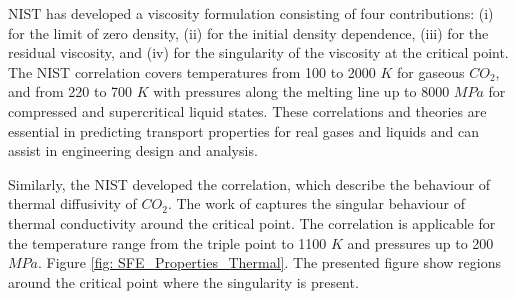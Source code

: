 \documentclass[../Article_Model_Parameters.tex]{subfiles}
\begin{document}
	NIST has developed a viscosity formulation consisting of four contributions: (i) for the limit of zero density, (ii) for the initial density dependence, (iii) for the residual viscosity, and (iv) for the singularity of the viscosity at the critical point. The NIST correlation covers temperatures from 100 to 2000 $K$ for gaseous $CO_2$, and from 220 to 700 $K$ with pressures along the melting line up to 8000 $MPa$ for compressed and supercritical liquid states. These correlations and theories are essential in predicting transport properties for real gases and liquids and can assist in engineering design and analysis.
	
	
	Similarly, the NIST developed the correlation, which describe the behaviour of thermal diffusivity of $CO_2$. The work of \citet{Huber2016} captures the singular behaviour of thermal conductivity around the critical point. The correlation is applicable for the temperature range from the triple point to 1100 $K$ and pressures up to 200 $MPa$. Figure \ref{fig: SFE_Properties_Thermal}. The presented figure show regions around the critical point where the singularity is present.
	
\end{document}
